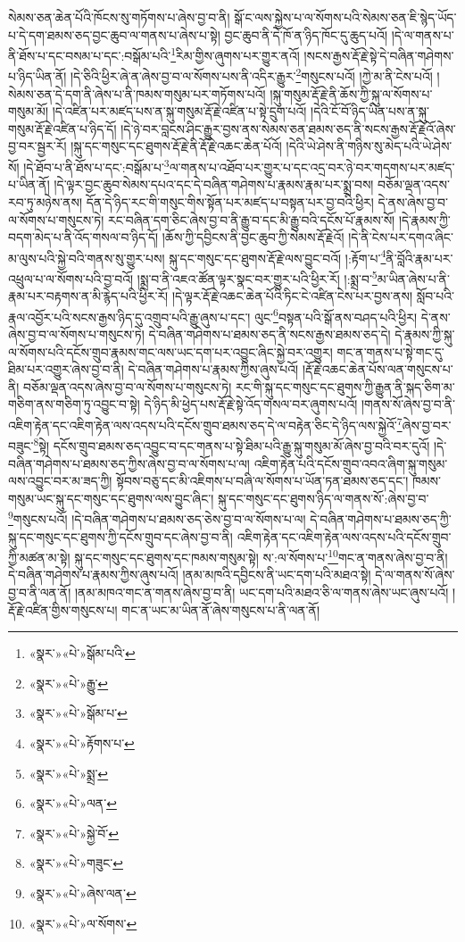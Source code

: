 སེམས་ཅན་ཆེན་པོའི་ཁོངས་སུ་གཏོགས་པ་ཞེས་བྱ་བ་ནི། སྒོ་ང་ལས་སྐྱེས་པ་ལ་སོགས་པའི་སེམས་ཅན་ཇི་སྙེད་ཡོད་པ་དེ་དག་ཐམས་ཅད་བྱང་ཆུབ་ལ་གནས་པ་ཞེས་པ་སྟེ། བྱང་ཆུབ་ནི་དེ་ཁོ་ན་ཉིད་ཁོང་དུ་ཆུད་པའོ། །དེ་ལ་གནས་པ་ནི་ཐོས་པ་དང་བསམ་པ་དང་:བསྒོམ་པའི་\footnote{«སྣར་»«པེ་»སྒོམ་པའི་}རིམ་གྱིས་ཞུགས་པར་གྱུར་ནའོ། །སངས་རྒྱས་རྡོ་རྗེ་སྟེ་དེ་བཞིན་གཤེགས་པ་ཉིད་ཡིན་ནོ། །དེ་ཅིའི་ཕྱིར་ཞེ་ན་ཞེས་བྱ་བ་ལ་སོགས་པས་ནི་འདིར་རྒྱུར་\footnote{«སྣར་»«པེ་»རྒྱུ་}གསུངས་པའོ། །ཀྱེ་མ་ནི་ངེས་པའོ། །སེམས་ཅན་དེ་དག་ནི་ཞེས་པ་ནི་ཁམས་གསུམ་པར་གཏོགས་པའོ། །སྐུ་གསུམ་རྡོ་རྗེ་ནི་ཆོས་ཀྱི་སྐུ་ལ་སོགས་པ་གསུམ་མོ། །དེ་འཛིན་པར་མཛད་པས་ན་སྐུ་གསུམ་རྡོ་རྗེ་འཛིན་པ་སྟེ་དྲུག་པའོ། །དེའི་ངོ་བོ་ཉིད་ཡིན་པས་ན་སྐུ་གསུམ་རྡོ་རྗེ་འཛིན་པ་ཉིད་དོ། །དེ་ཉེ་བར་བླངས་ཤིང་རྒྱུར་བྱས་ནས་སེམས་ཅན་ཐམས་ཅད་ནི་སངས་རྒྱས་རྡོ་རྗེའོ་ཞེས་བྱ་བར་སྦྱར་རོ། །སྐུ་དང་གསུང་དང་ཐུགས་རྡོ་རྗེ་ནི་རྡོ་རྗེ་འཆང་ཆེན་པོའོ། །དེའི་ཡེ་ཤེས་ནི་གཉིས་སུ་མེད་པའི་ཡེ་ཤེས་སོ། །དེ་ཐོབ་པ་ནི་ཐོས་པ་དང་:བསྒོམ་པ་\footnote{«སྣར་»«པེ་»སྒོམ་པ་}ལ་གནས་པ་འཐོབ་པར་གྱུར་པ་དང་འདྲ་བར་ཉེ་བར་གདགས་པར་མཛད་པ་ཡིན་ནོ། །དེ་ལྟར་བྱང་ཆུབ་སེམས་དཔའ་དང་དེ་བཞིན་གཤེགས་པ་རྣམས་རྣམ་པར་སྨྲ་བས། བཅོམ་ལྡན་འདས་རབ་ཏུ་མཉེས་ནས། དོན་དེ་ཉིད་རང་གི་གསུང་གིས་སྟོན་པར་མཛད་པ་བསྟན་པར་བྱ་བའི་ཕྱིར། དེ་ནས་ཞེས་བྱ་བ་ལ་སོགས་པ་གསུངས་ཏེ། རང་བཞིན་དག་ཅིང་ཞེས་བྱ་བ་ནི་རྒྱུ་བ་དང་མི་རྒྱུ་བའི་དངོས་པོ་རྣམས་སོ། །དེ་རྣམས་ཀྱི་བདག་མེད་པ་ནི་འོད་གསལ་བ་ཉིད་དོ། །ཆོས་ཀྱི་དབྱིངས་ནི་བྱང་ཆུབ་ཀྱི་སེམས་རྡོ་རྗེའོ། །དེ་ནི་ངེས་པར་དགའ་ཞིང་མ་ལུས་པའི་སྐྱེ་བའི་གནས་སུ་གྱུར་པས། སྐུ་དང་གསུང་དང་ཐུགས་རྡོ་རྗེ་ལས་བྱུང་བའོ། །:རྟོག་པ་\footnote{«སྣར་»«པེ་»རྟོགས་པ་}ནི་བློའི་རྣམ་པར་འཕྲུལ་པ་ལ་སོགས་པའི་བྱ་བའོ། །སྨྲ་བ་ནི་འཇའ་ཚོན་ལྟར་སྣང་བར་གྱུར་པའི་ཕྱིར་རོ། །:སྨྲ་བ་\footnote{«སྣར་»«པེ་»སྨྲ་}མ་ཡིན་ཞེས་པ་ནི་རྣམ་པར་བརྟགས་ན་མི་རྙེད་པའི་ཕྱིར་རོ། །དེ་ལྟར་རྡོ་རྗེ་འཆང་ཆེན་པོའི་ཏིང་ངེ་འཛིན་ངེས་པར་བྱས་ནས། སློབ་པའི་རྣལ་འབྱོར་པའི་སངས་རྒྱས་ཉིད་དུ་འགྲུབ་པའི་རྒྱུ་ཞུས་པ་དང་། ལུང་\footnote{«སྣར་»«པེ་»ལན་}བསྟན་པའི་སྒོ་ནས་བཤད་པའི་ཕྱིར། དེ་ནས་ཞེས་བྱ་བ་ལ་སོགས་པ་གསུངས་ཏེ། དེ་བཞིན་གཤེགས་པ་ཐམས་ཅད་ནི་སངས་རྒྱས་ཐམས་ཅད་དེ། དེ་རྣམས་ཀྱི་སྐུ་ལ་སོགས་པའི་དངོས་གྲུབ་རྣམས་གང་ལས་ཡང་དག་པར་འབྱུང་ཞིང་སྐྱེ་བར་འགྱུར། གང་ན་གནས་པ་སྟེ་གང་དུ་ཐིམ་པར་འགྱུར་ཞེས་བྱ་བ་ནི། དེ་བཞིན་གཤེགས་པ་རྣམས་ཀྱིས་ཞུས་པའོ། །རྡོ་རྗེ་འཆང་ཆེན་པོས་ལན་གསུངས་པ་ནི། བཅོམ་ལྡན་འདས་ཞེས་བྱ་བ་ལ་སོགས་པ་གསུངས་ཏེ། རང་གི་སྐུ་དང་གསུང་དང་ཐུགས་ཀྱི་རྒྱུན་ནི་སྐད་ཅིག་མ་གཅིག་ནས་གཅིག་ཏུ་འབྱུང་བ་སྟེ། དེ་ཉིད་མི་ཕྱེད་པས་རྡོ་རྗེ་སྟེ་འོད་གསལ་བར་ཞུགས་པའོ། །གནས་སོ་ཞེས་བྱ་བ་ནི་འཇིག་རྟེན་དང་འཇིག་རྟེན་ལས་འདས་པའི་དངོས་གྲུབ་ཐམས་ཅད་དེ་ལ་བརྟེན་ཅིང་དེ་ཉིད་ལས་སྐྱེའོ་\footnote{«སྣར་»«པེ་»སྐྱེ་བོ་}ཞེས་བྱ་བར་བཟུང་\footnote{«སྣར་»«པེ་»གཟུང་}སྟེ། དངོས་གྲུབ་ཐམས་ཅད་འབྱུང་བ་དང་གནས་པ་སྟེ་ཐིམ་པའི་རྒྱུ་སྐུ་གསུམ་མོ་ཞེས་བྱ་བའི་བར་དུའོ། །དེ་བཞིན་གཤེགས་པ་ཐམས་ཅད་ཀྱིས་ཞེས་བྱ་བ་ལ་སོགས་པ་ལ། འཇིག་རྟེན་པའི་དངོས་གྲུབ་འབའ་ཞིག་སྐུ་གསུམ་ལས་འབྱུང་བར་མ་ཟད་ཀྱི། སྟོབས་བཅུ་དང་མི་འཇིགས་པ་བཞི་ལ་སོགས་པ་ཡོན་ཏན་ཐམས་ཅད་དང་། ཁམས་གསུམ་ཡང་སྐུ་དང་གསུང་དང་ཐུགས་ལས་བྱུང་ཞིང་། སྐུ་དང་གསུང་དང་ཐུགས་ཉིད་ལ་གནས་སོ་:ཞེས་བྱ་བ་\footnote{«སྣར་»«པེ་»ཞེས་ལན་}གསུངས་པའོ། །དེ་བཞིན་གཤེགས་པ་ཐམས་ཅད་ཅེས་བྱ་བ་ལ་སོགས་པ་ལ། དེ་བཞིན་གཤེགས་པ་ཐམས་ཅད་ཀྱི་སྐུ་དང་གསུང་དང་ཐུགས་ཀྱི་དངོས་གྲུབ་དང་ཞེས་བྱ་བ་ནི། འཇིག་རྟེན་དང་འཇིག་རྟེན་ལས་འདས་པའི་དངོས་གྲུབ་ཀྱི་མཚན་མ་སྟེ། སྐུ་དང་གསུང་དང་ཐུགས་དང་ཁམས་གསུམ་སྟེ། ས་:ལ་སོགས་པ་\footnote{«སྣར་»«པེ་»ལ་སོགས་}གང་ན་གནས་ཞེས་བྱ་བ་ནི། དེ་བཞིན་གཤེགས་པ་རྣམས་ཀྱིས་ཞུས་པའོ། །ནམ་མཁའི་དབྱིངས་ནི་ཡང་དག་པའི་མཐའ་སྟེ། དེ་ལ་གནས་སོ་ཞེས་བྱ་བ་ནི་ལན་ནོ། །ནམ་མཁའ་གང་ན་གནས་ཞེས་བྱ་བ་ནི། ཡང་དག་པའི་མཐའ་ཅི་ལ་གནས་ཞེས་ཡང་ཞུས་པའོ། །རྡོ་རྗེ་འཛིན་གྱིས་གསུངས་པ། གང་ན་ཡང་མ་ཡིན་ནོ་ཞེས་གསུངས་པ་ནི་ལན་ནོ། 